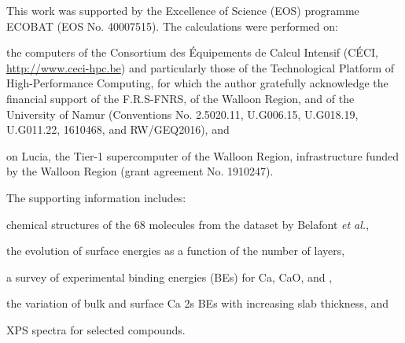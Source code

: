 \documentclass[journal=jpccck,manuscript=article]{achemso}
\begin{document}
\begin{acknowledgement}
	This work was supported by the Excellence of Science (EOS) programme  ECOBAT (EOS No. 40007515). 
	The calculations were performed on: \begin{inparaenum}[(i)]
	\item the computers of the Consortium des \'{E}quipements de Calcul Intensif (C\'{E}CI, \url{http://www.ceci-hpc.be}) and particularly those of the Technological Platform of High-Performance Computing, for which the author gratefully acknowledge the financial support of the F.R.S-FNRS, of the Walloon Region, and of the University of Namur (Conventions No. 2.5020.11, U.G006.15, U.G018.19, U.G011.22, 1610468, and RW/GEQ2016), and
	\item on Lucia, the Tier-1 supercomputer of the Walloon Region, infrastructure funded by the Walloon Region (grant agreement No. 1910247).
	\end{inparaenum} 
\end{acknowledgement}

\begin{suppinfo}
	The supporting information includes: \begin{inparaenum}[(i)]
		\item chemical structures of the 68 molecules from the dataset by Belafont \textit{et al.}\cite{pueyobellafontPredictingCoreLevel2017},
		\item the evolution of surface energies as a function of the number of layers,
		\item a survey of experimental binding energies (BEs) for Ca, CaO, and ,
		\item the variation of bulk and surface Ca 2s BEs with increasing slab thickness, and
		\item XPS spectra for selected compounds.
	\end{inparaenum}
\end{suppinfo}


\clearpage

	
\end{document}
